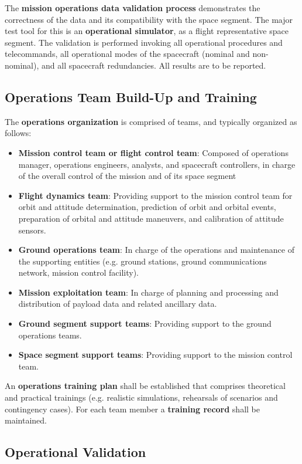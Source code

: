 The \textbf{mission operations data validation process} demonstrates the correctness of the data and its compatibility with the space segment. The major test tool for this is an \textbf{operational simulator}, as a flight representative space segment. The validation is performed invoking all operational procedures and telecommands, all operational modes of the spacecraft (nominal and non-nominal), and all spacecraft redundancies. All results are to be reported.

\subsection{Operations Team Build-Up and Training}

The \textbf{operations organization} is comprised of teams, and typically organized as follows:
 
\begin{itemize}
\item \textbf{Mission control team or flight control team}: Composed of operations manager, operations engineers, analysts, and spacecraft controllers, in charge of the overall control of the mission and of its space segment
\item \textbf{Flight dynamics team}: Providing support to the mission control team for orbit and attitude determination, prediction of orbit and orbital events, preparation of orbital and attitude maneuvers, and calibration of attitude sensors.
\item \textbf{Ground operations team}: In charge of the operations and maintenance of the supporting entities (e.g. ground stations, ground communications network, mission control facility).
\item \textbf{Mission exploitation team}: In charge of planning and processing and distribution of payload data and related ancillary data.
\item \textbf{Ground segment support teams}: Providing support to the ground operations teams.
\item \textbf{Space segment support teams}: Providing support to the mission control team.
\end{itemize}

An \textbf{operations training plan} shall be established that comprises theoretical and practical trainings (e.g. realistic simulations, rehearsals of scenarios and contingency cases). For each team member a \textbf{training record} shall be maintained.

\subsection{Operational Validation}
\label{sec:Operational Validation}

